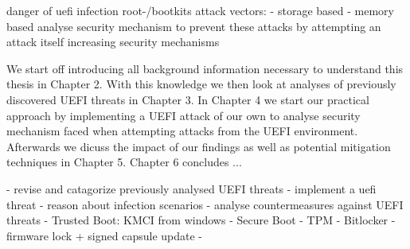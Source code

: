 danger of uefi infection
root-/bootkits
attack vectors:
- storage based
- memory based
analyse security mechanism to prevent these attacks by attempting an attack itself
increasing security mechanisms

We start off introducing all background information necessary to understand this thesis in Chapter 2. With this knowledge we then look at analyses of previously discovered UEFI threats in Chapter 3. In Chapter 4 we start our practical approach by implementing a UEFI attack of our own to analyse security mechanism faced when attempting attacks from the UEFI environment. Afterwards we dicuss the impact of our findings as well as potential mitigation techniques in Chapter 5. Chapter 6 concludes ...

- revise and catagorize previously analysed UEFI threats
- implement a uefi threat
- reason about infection scenarios
- analyse countermeasures against UEFI threats
- Trusted Boot: KMCI from windows
- Secure Boot
- TPM
- Bitlocker
- firmware lock + signed capsule update
-